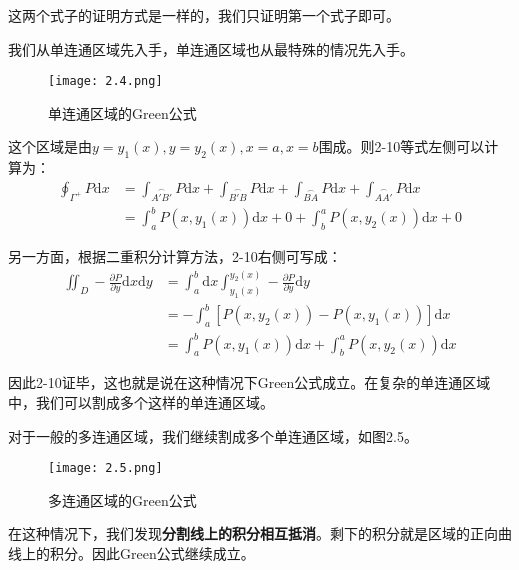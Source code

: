 \documentclass{ctexart}
\let\oldtextbf\textbf
\renewcommand{\textbf}[1]{\textcolor{brown!50!red}{\oldtextbf{#1}}}
\begin{document}
这两个式子的证明方式是一样的，我们只证明第一个式子即可。

我们从单连通区域先入手，单连通区域也从最特殊的情况先入手。
\begin{figure}[H]    
\centering     
\renewcommand{\figurename}{图}     
\renewcommand{\thefigure}{2.4}    
\begin{myimagebox}[width=0.3\textwidth] %
\texttt{[image: 2.4.png]} %
\end{myimagebox}     
\caption{\label{fig:2.4}单连通区域的Green公式}   
\end{figure}

这个区域是由$y=y_1(x),y=y_2(x),x=a,x=b$围成。则2-10等式左侧可以计算为：
\begin{align*}
\oint_{\Gamma^+}P\mathrm{d}x&=\int_{\stackrel\frown{A'B'}}P\mathrm{d}x+
\int_{\stackrel\frown{B'B}}P\mathrm{d}x+\int_{\stackrel\frown{BA}}P\mathrm{d}x+
\int_{\stackrel\frown{AA'}}P\mathrm{d}x\\
&=\int_a^bP(x,y_1(x))\mathrm{d}x+0+\int_b^aP(x,y_2(x))\mathrm{d}x+0  
\end{align*}

另一方面，根据二重积分计算方法，2-10右侧可写成：
\begin{align*}
\iint_D-\frac{\partial  P}{\partial  y}\mathrm{d}x\mathrm{d}y&=\int_a^b\mathrm{d}x\int_{y_1(x)}
^{y_2(x)}  -\frac{\partial  P}{\partial  y}\mathrm{d}y\\
&=-\int_a^b[P(x,y_2(x))-P(x,y_1(x))]\mathrm{d}x\\
&=\int_a^bP(x,y_1(x))\mathrm{d}x+\int_b^aP(x,y_2(x))\mathrm{d}x
\end{align*}

因此2-10证毕，这也就是说在这种情况下Green公式成立。在复杂的单连通区域中，我们可以割成多个这样的单连通区域。

对于一般的多连通区域，我们继续割成多个单连通区域，如图2.5。
\begin{figure}[H]    
\centering     
\renewcommand{\figurename}{图}     
\renewcommand{\thefigure}{2.5}    
\begin{myimagebox}[width=0.7\textwidth] %
\texttt{[image: 2.5.png]} %
\end{myimagebox}     
\caption{\label{fig:2.5}多连通区域的Green公式}   
\end{figure}

在这种情况下，我们发现\textbf{\color{brown!50!red}分割线上的积分相互抵消}。剩下的积分就是区域的正向曲线上的积分。因此Green公式继续成立。
\end{document}
